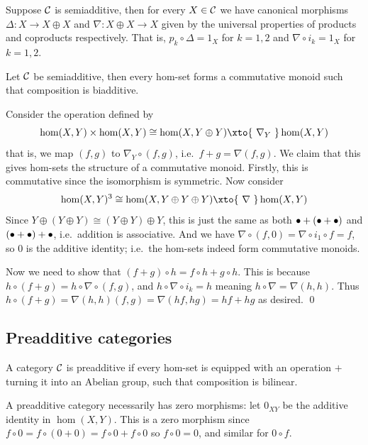 \edefn

Suppose ${{\cal C}}$ is semiadditive, then for every $X\in{{\cal C}}$ we have canonical morphisms $\Delta\colon X\to X\oplus X$ and $\nabla\colon X\oplus X\to X$ given by the universal properties
of products and coproducts respectively.
That is, $p_k\circ\Delta=1_X$ for $k=1,2$ and $\nabla\circ i_k=1_X$ for $k=1,2$.

\bprop

    Let ${{\cal C}}$ be semiadditive, then every hom-set forms a commutative monoid such that composition is biadditive.

\eprop

\bproof

    Consider the operation defined by
    $$ \hom(X,Y)\times\hom(X,Y) \cong \hom(X,Y\oplus Y) \xto{\ \nabla_Y\ } \hom(X,Y) $$
    that is, we map $(f,g)$ to $\nabla_Y\circ(f,g)$, i.e.\ $f+g=\nabla(f,g)$.
    We claim that this gives hom-sets the structure of a commutative monoid.
    Firstly, this is commutative since the isomorphism is symmetric.
    Now consider
    $$ \hom(X,Y)^3 \cong \hom(X,Y\oplus Y\oplus Y) \xto{\ \nabla\ }\hom(X,Y) $$
    Since $Y\oplus(Y\oplus Y)\cong(Y\oplus Y)\oplus Y$, this is just the same as both $\bullet+(\bullet+\bullet)$ and $(\bullet+\bullet)+\bullet$, i.e.\ addition is associative.
    And we have $\nabla\circ(f,0)=\nabla\circ i_1\circ f=f$, so $0$ is the additive identity; i.e.\ the hom-sets indeed form commutative monoids.

    Now we need to show that $(f+g)\circ h=f\circ h+g\circ h$.
    This is because $h\circ (f+g)=h\circ \nabla\circ(f,g)$, and $h\circ\nabla\circ i_k=h$ meaning $h\circ\nabla=\nabla(h,h)$.
    Thus $h\circ(f+g)=\nabla(h,h)(f,g)=\nabla(hf,hg)=hf+hg$ as desired.
    \qed

\eproof

\subsection{Preadditive categories}

\bdefn

    A category ${{\cal C}}$ is {\emphcolor preadditive} if every hom-set is equipped with an operation $+$ turning it into an Abelian group, such that composition is bilinear.

\edefn

A preadditive category necessarily has zero morphisms: let $0_{XY}$ be the additive identity in $\hom(X,Y)$.
This is a zero morphism since $f\circ0=f\circ(0+0)=f\circ0+f\circ0$ so $f\circ0=0$, and similar for $0\circ f$.

